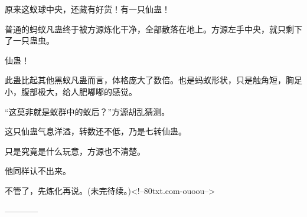\begin{this_body}
原来这蚁球中央，还藏有好货！有一只仙蛊！

普通的蚂蚁凡蛊终于被方源炼化干净，全部散落在地上。方源左手中央，就只剩下了一只蛊虫。

仙蛊！

此蛊比起其他黑蚁凡蛊而言，体格庞大了数倍。也是蚂蚁形状，只是触角短，胸足小，腹部极大，给人肥嘟嘟的感觉。

“这莫非就是蚁群中的蚁后？”方源胡乱猜测。

这只仙蛊气息洋溢，转数还不低，乃是七转仙蛊。

只是究竟是什么玩意，方源也不清楚。

他同样认不出来。

不管了，先炼化再说。(未完待续。)<!--80txt.com-ouoou-->

------------

\end{this_body}

